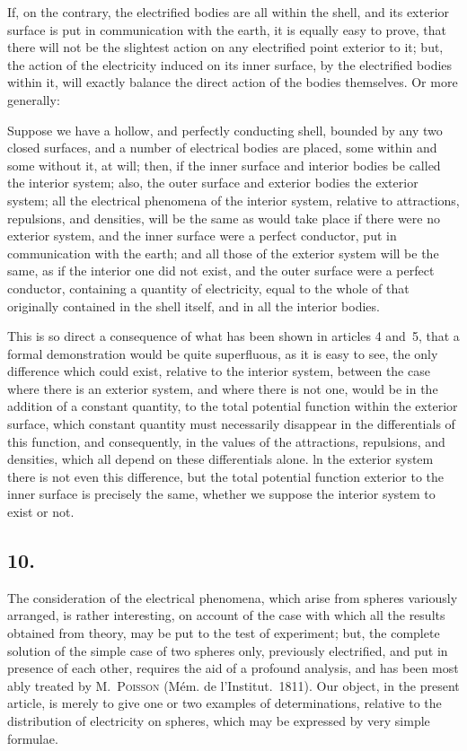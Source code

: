 \documentclass[11pt,notitlepage]{amsart}
\let\Person\textsc
\newcommand\Section[1]{\subsection{{#1}}}
\begin{document}
If, on the contrary, the electrified bodies are all within the shell, and
its exterior surface is put in communication with the earth, it is equally easy
to prove, that there will not be the slightest action on any electrified point
exterior to it; but, the action of the electricity induced on its inner surface,
by the electrified bodies within it, will exactly balance the direct action of
the bodies themselves. Or more generally:

Suppose we have a hollow, and perfectly conducting shell, bounded by any
two closed surfaces,
and a number of electrical bodies are placed, some within and
some without it, at will;
then, if the inner surface and interior bodies be called
the interior system; also, the outer surface and exterior bodies the exterior
system;
all the electrical phenomena of the interior system, relative to attractions,
repulsions, and densities, will be the same as would take place if there were
no exterior system, and the inner surface were a perfect conductor, put in
communication with the earth; and all those of the exterior system will be
the same, as if the interior one did not exist, and the outer surface were a
perfect conductor, containing a quantity of electricity, equal to the whole of
that originally contained in the shell itself, and in all the interior bodies.

This is so direct a consequence of what has been shown in articles
4 and~5, that a formal demonstration would be quite superfluous, as it is easy
to see, the only difference which could exist, relative to the interior system,
between the case where there is an exterior system, and where there is not
one, would be in the addition of a constant quantity, to the total potential
function within the exterior surface, which constant quantity must necessarily
disappear in the differentials of this function, and consequently, in the values
of the attractions, repulsions, and densities, which all depend on these 
differentials alone.
ln the exterior system there is not even this difference, but
the total potential function
exterior to the inner surface is precisely the same,
whether we suppose the interior system to exist or not.
\bigskip

\Section{10.}
The consideration of the electrical phenomena, which arise from spheres
variously arranged, is rather interesting, on account of the case with which
all the results obtained from theory, may be put to the test of experiment;
but, the complete solution of the simple case of two spheres only, previously
electrified, and put in presence of each other, requires the aid of a profound
analysis, and has been most ably treated by M.~\Person{Poisson}
(M\'em. de l'Institut.~1811).
Our object, in the present article, is merely to give one or two examples of
determinations,
relative to the distribution of electricity on spheres, which may
be expressed by very simple formulae.
\end{document}
